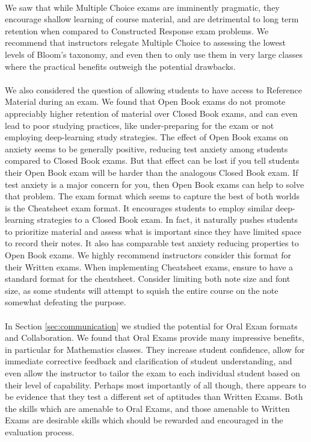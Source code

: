 \documentclass[12pt]{article}
\begin{document}
\paragraph{}
We saw that while Multiple Choice exams are imminently pragmatic, they encourage shallow learning of course material, and are detrimental to long term retention when compared to Constructed Response exam problems. We recommend that instructors relegate Multiple Choice to assessing the lowest levels of Bloom's taxonomy, and even then to only use them in very large classes where the practical benefits outweigh the potential drawbacks.
\paragraph{}
We also considered the question of allowing students to have access to Reference Material during an exam. We found that Open Book exams do not promote appreciably higher retention of material over Closed Book exams, and can even lead to poor studying practices, like under-preparing for the exam or not employing deep-learning study strategies. The effect of Open Book exams on anxiety seems to be generally positive, reducing test anxiety among students compared to Closed Book exams. But that effect can be lost if you tell students their Open Book exam will be harder than the analogous Closed Book exam. If test anxiety is a major concern for you, then Open Book exams can help to solve that problem. The exam format which seems to capture the best of both worlds is the Cheatsheet exam format. It encourages students to employ similar deep-learning strategies to a Closed Book exam. In fact, it naturally pushes students to prioritize material and assess what is important since they have limited space to record their notes. It also has comparable test anxiety reducing properties to Open Book exams. We highly recommend instructors consider this format for their Written exams. When implementing Cheatsheet exams, ensure to have a standard format for the cheatsheet. Consider limiting both note size and font size, as some students will attempt to squish the entire course on the note somewhat defeating the purpose.
\paragraph{}
In Section \ref{sec:communication} we studied the potential for Oral Exam formats and Collaboration. We found that Oral Exams provide many impressive benefits, in particular for Mathematics classes. They increase student confidence, allow for immediate corrective feedback and clarification of student understanding, and even allow the instructor to tailor the exam to each individual student based on their level of capability. Perhaps most importantly of all though, there appears to be evidence that they test a different set of aptitudes than Written Exams. Both the skills which are amenable to Oral Exams, and those amenable to Written Exams are desirable skills which should be rewarded and encouraged in the evaluation process.
\end{document}

